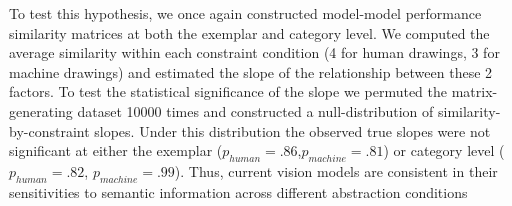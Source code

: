 \documentclass[10pt,letterpaper]{article}
\begin{document}
To test this hypothesis, we once again constructed model-model performance similarity matrices at both the exemplar and category level. 
We computed the average similarity within each constraint condition (4 for human drawings, 3 for machine drawings) and estimated the slope of the relationship between these 2 factors. 
To test the statistical significance of the slope we permuted the matrix-generating dataset 10000 times and constructed a null-distribution of similarity-by-constraint slopes. Under this distribution the observed true slopes were not significant at either the exemplar ($p_{human} = .86$,$ p_{machine}  = .81$) or category level ($p_{human}  = .82$, $p_{machine} = .99$). 
Thus, current vision models are consistent in their sensitivities to semantic information across different abstraction conditions






\end{document}
